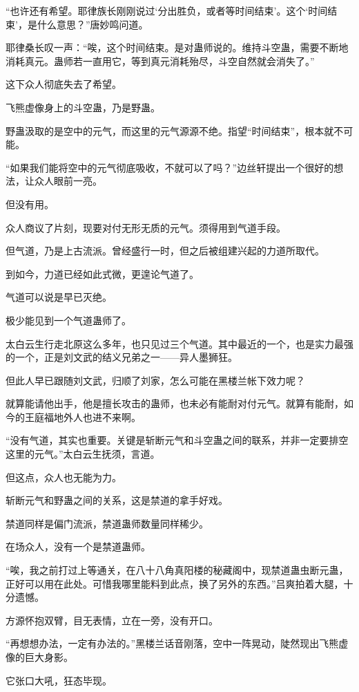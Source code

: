 \begin{this_body}
“也许还有希望。耶律族长刚刚说过‘分出胜负，或者等时间结束’。这个‘时间结束’，是什么意思？”唐妙鸣问道。

耶律桑长叹一声：“唉，这个时间结束。是对蛊师说的。维持斗空蛊，需要不断地消耗真元。蛊师若一直用它，等到真元消耗殆尽，斗空自然就会消失了。”

这下众人彻底失去了希望。

飞熊虚像身上的斗空蛊，乃是野蛊。

野蛊汲取的是空中的元气，而这里的元气源源不绝。指望“时间结束”，根本就不可能。

“如果我们能将空中的元气彻底吸收，不就可以了吗？”边丝轩提出一个很好的想法，让众人眼前一亮。

但没有用。

众人商议了片刻，现要对付无形无质的元气。须得用到气道手段。

但气道，乃是上古流派。曾经盛行一时，但之后被组建兴起的力道所取代。

到如今，力道已经如此式微，更遑论气道了。

气道可以说是早已灭绝。

极少能见到一个气道蛊师了。

太白云生行走北原这么多年，也只见过三个气道。其中最近的一个，也是实力最强的一个，正是刘文武的结义兄弟之一——异人墨狮狂。

但此人早已跟随刘文武，归顺了刘家，怎么可能在黑楼兰帐下效力呢？

就算能请他出手，他是擅长攻击的蛊师，也未必有能耐对付元气。就算有能耐，如今的王庭福地外人也进不来啊。

“没有气道，其实也重要。关键是斩断元气和斗空蛊之间的联系，并非一定要排空这里的元气。”太白云生抚须，言道。

但这点，众人也无能为力。

斩断元气和野蛊之间的关系，这是禁道的拿手好戏。

禁道同样是偏门流派，禁道蛊师数量同样稀少。

在场众人，没有一个是禁道蛊师。

“唉，我之前打过上等通关，在八十八角真阳楼的秘藏阁中，现禁道蛊虫断元蛊，正好可以用在此处。可惜我哪里能料到此点，换了另外的东西。”吕爽拍着大腿，十分遗憾。

方源怀抱双臂，目无表情，立在一旁，没有开口。

“再想想办法，一定有办法的。”黑楼兰话音刚落，空中一阵晃动，陡然现出飞熊虚像的巨大身影。

它张口大吼，狂态毕现。


\end{this_body}
